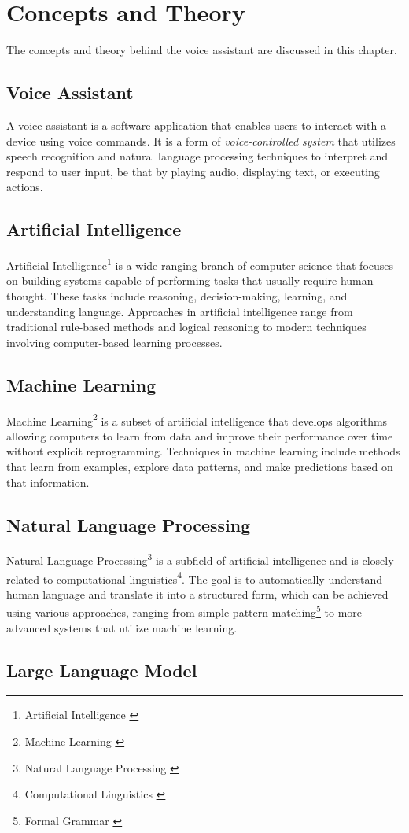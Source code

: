 \cleardoubleemptypage
\renewcommand*\chapterpagestyle{scrheadings}

\chapter{Concepts and Theory}
The concepts and theory behind the voice assistant are discussed in this chapter.

\section{Voice Assistant}
A voice assistant is a software application that enables users  
to interact with a device using voice commands.  
It is a form of \textit{voice-controlled system} that utilizes speech recognition  
and natural language processing techniques to interpret and respond  
to user input,  
be that by playing audio, displaying text, or executing actions.

\section{Artificial Intelligence}
Artificial Intelligence\footnote{Artificial Intelligence \cite{ai}} is a wide-ranging branch  
of computer science that focuses on building systems capable of performing  
tasks that usually require human thought.  
These tasks include reasoning, decision-making, learning, and understanding  
language. Approaches in artificial intelligence range from traditional rule-based methods  
and logical reasoning to modern techniques involving computer-based learning processes.

\section{Machine Learning}
Machine Learning\footnote{Machine Learning \cite{ml}} is a subset of artificial intelligence  
that develops algorithms allowing computers to learn from data and improve  
their performance over time without explicit reprogramming.  
Techniques in machine learning include methods that learn from examples,  
explore data patterns, and make predictions based on that information.

\section{Natural Language Processing}
Natural Language Processing\footnote{Natural Language Processing \cite{nlp}} is a subfield of artificial intelligence  
and is closely related to computational linguistics\footnote{Computational Linguistics \cite{cl}}.  
The goal is to automatically understand human language and translate it into  
a structured form, which can be achieved using various approaches,  
ranging from simple pattern matching\footnote{Formal Grammar \cite{pm}}  
to more advanced systems that utilize machine learning.

\section{Large Language Model}